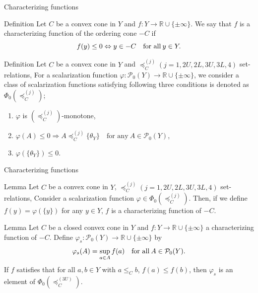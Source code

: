 \documentclass[aspectratio=169, dvipdfmx, 11pt]{beamer}
\newcommand{\rnum}{\mathbb{R}}
\newcommand{\pow}[1]{\mathcal{P}_{0}(#1)}
\newcommand{\bleq}[1]{\leq_{#1}\!}
\newcommand{\setrel}[2]{\preccurlyeq^{(#1)}_{#2}\!}
\begin{document}
\begin{frame}{Characterizing functions}
  \begin{block}{Definition \cite{eichfelder2021optimality}}
    Let $C$ be a convex cone in $Y$ and $f: Y \to \rnum \cup \{\pm \infty\}$.
    We say that $f$ is a characterizing function of the ordering cone $-C$ if
    \begin{equation}
      f(y) \leq 0 \Leftrightarrow y \in -C \quad \text{for all}\: y \in Y. \notag
    \end{equation}
  \end{block}
  \begin{block}{Definition}
    Let $C$ be a convex cone in $Y$ and
    $\setrel{j}{C} (j= 1, 2U, 2L, 3U, 3L, 4)$ set-relations,
    For a scalarization function $\varphi: \pow{Y} \to \rnum \cup \{\pm \infty\}$,
    we consider a class of scalarization functions satisfying
    following three conditions is denoted as $\Phi_0(\setrel{j}{C})$;
    \begin{enumerate}
      \item $\varphi$ is $(\setrel{j}{C})$-monotone,
      \item $\varphi (A) \leq 0 \Rightarrow  A \setrel{j}{C} \{\theta_Y\}\quad\text{for any}\:A\in \pow{Y}$,
      \item $\varphi(\{\theta_{Y}\}) \leq 0$.
    \end{enumerate}
  \end{block}
\end{frame}

\begin{frame}{Characterizing functions}
  \begin{block}{Lemma}
    Let $C$ be a convex cone in $Y$,
    $\setrel{j}{C} (j= 1, 2U, 2L, 3U, 3L, 4)$ set-relations,
    Consider a scalarization function $\varphi \in \Phi_0(\setrel{j}{C})$.
    Then, if we define $f(y) = \varphi (\{y\})$ for any $y \in Y$,
    $f$ is a characterizing function of $-C$.
  \end{block}
  \begin{block}{Lemma}
    Let $C$ be a closed convex cone in $Y$ and $f: Y \to \rnum \cup \{\pm \infty\}$
    a characterizing function of $-C$. Define $\varphi_s : \pow{Y} \to \rnum \cup \{\pm \infty\}$ by
    \begin{equation}
      \varphi_s (A) = \sup_{a \in A} f(a) \quad \text{for all}\: A \in \pow{Y}. \notag
    \end{equation}
    If $f$ satisfies that for all $a, b \in Y$ with $a \bleq{C} b$, $f(a) \leq f(b)$,
    then $\varphi_s$ is an element of $\Phi_0(\setrel{3U}{C})$.
  \end{block}
\end{frame}
\end{document}
